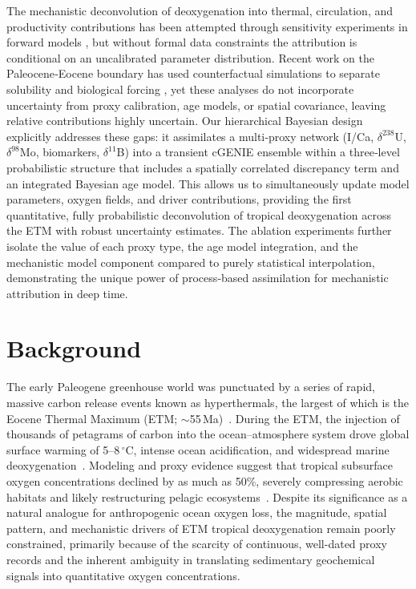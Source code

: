 \documentclass{article}
\begin{document}
The mechanistic deconvolution of deoxygenation into thermal, circulation, and productivity contributions has been attempted through sensitivity experiments in forward models \cite{Weber2018cGENIE}, but without formal data constraints the attribution is conditional on an uncalibrated parameter distribution. Recent work on the Paleocene‐Eocene boundary has used counterfactual simulations to separate solubility and biological forcing \cite{Alexander2016PETM}, yet these analyses do not incorporate uncertainty from proxy calibration, age models, or spatial covariance, leaving relative contributions highly uncertain. Our hierarchical Bayesian design explicitly addresses these gaps: it assimilates a multi‐proxy network (I/Ca, $\delta^{238}$U, $\delta^{98}$Mo, biomarkers, $\delta^{11}$B) into a transient cGENIE ensemble within a three‐level probabilistic structure that includes a spatially correlated discrepancy term and an integrated Bayesian age model. This allows us to simultaneously update model parameters, oxygen fields, and driver contributions, providing the first quantitative, fully probabilistic deconvolution of tropical deoxygenation across the ETM with robust uncertainty estimates. The ablation experiments further isolate the value of each proxy type, the age model integration, and the mechanistic model component compared to purely statistical interpolation, demonstrating the unique power of process‐based assimilation for mechanistic attribution in deep time.

\section{Background}
The early Paleogene greenhouse world was punctuated by a series of rapid, massive carbon release events known as hyperthermals, the largest of which is the Eocene Thermal Maximum (ETM; $\sim$55\,Ma)~\cite{Zachos2008,McInerney2011}. During the ETM, the injection of thousands of petagrams of carbon into the ocean–atmosphere system drove global surface warming of 5–8\,$^{\circ}$C, intense ocean acidification, and widespread marine deoxygenation~\cite{DunkleyJones2013,Clarkson2021}. Modeling and proxy evidence suggest that tropical subsurface oxygen concentrations declined by as much as 50\%, severely compressing aerobic habitats and likely restructuring pelagic ecosystems~\cite{Ridgwell2007,Keeling2010}. Despite its significance as a natural analogue for anthropogenic ocean oxygen loss, the magnitude, spatial pattern, and mechanistic drivers of ETM tropical deoxygenation remain poorly constrained, primarily because of the scarcity of continuous, well-dated proxy records and the inherent ambiguity in translating sedimentary geochemical signals into quantitative oxygen concentrations.
\end{document}
